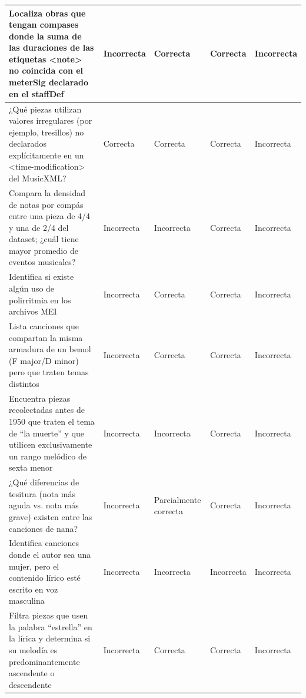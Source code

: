 \begin{longtable}{|m{5cm}|m{2.5cm}|m{2.5cm}|m{2.5cm}|m{2.5cm}|}
\hline

Localiza obras que tengan compases donde la suma de las duraciones de las etiquetas <note> no coincida con el meterSig declarado en el staffDef &
Incorrecta &
Correcta &
Correcta &
Incorrecta \\

\hline

¿Qué piezas utilizan valores irregulares (por ejemplo, tresillos) no declarados explícitamente en un <time-modification> del MusicXML? &
Correcta &
Correcta &
Correcta &
Incorrecta \\

\hline

Compara la densidad de notas por compás entre una pieza de 4/4 y una de 2/4 del dataset; ¿cuál tiene mayor promedio de eventos musicales? &
Incorrecta &
Incorrecta &
Correcta &
Incorrecta \\

\hline

Identifica si existe algún uso de polirritmia en los archivos MEI &
Incorrecta &
Correcta &
Correcta &
Incorrecta \\

\hline

Lista canciones que compartan la misma armadura de un bemol (F major/D minor) pero que traten temas distintos &
Incorrecta &
Correcta &
Correcta &
Incorrecta \\

\hline

Encuentra piezas recolectadas antes de 1950 que traten el tema de ``la muerte'' y que utilicen exclusivamente un rango melódico de sexta menor &
Incorrecta &
Incorrecta &
Correcta &
Incorrecta \\

\hline

¿Qué diferencias de tesitura (nota más aguda vs. nota más grave) existen entre las canciones de nana? &
Incorrecta &
Parcialmente correcta &
Correcta &
Incorrecta \\

\hline

Identifica canciones donde el autor sea una mujer, pero el contenido lírico esté escrito en voz masculina &
Incorrecta &
Incorrecta &
Incorrecta &
Incorrecta \\

\hline

Filtra piezas que usen la palabra ``estrella'' en la lírica y determina si su melodía es predominantemente ascendente o descendente &
Incorrecta &
Correcta &
Correcta &
Incorrecta \\


\end{longtable}
